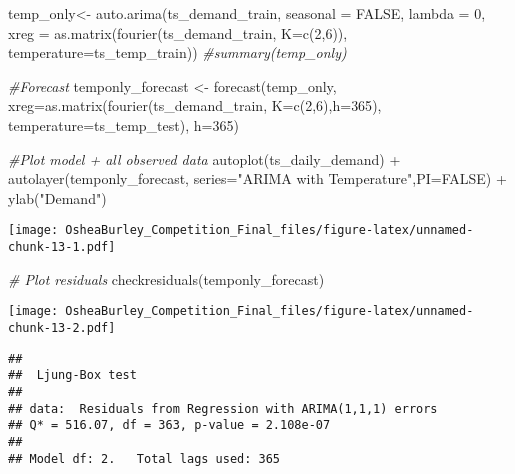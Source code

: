 \documentclass[
]{article}
\newenvironment{Shaded}{\begin{snugshade}}{\end{snugshade}}
\newcommand{\AttributeTok}[1]{\textcolor[rgb]{0.77,0.63,0.00}{#1}}
\newcommand{\CommentTok}[1]{\textcolor[rgb]{0.56,0.35,0.01}{\textit{#1}}}
\newcommand{\ConstantTok}[1]{\textcolor[rgb]{0.00,0.00,0.00}{#1}}
\newcommand{\DecValTok}[1]{\textcolor[rgb]{0.00,0.00,0.81}{#1}}
\newcommand{\FunctionTok}[1]{\textcolor[rgb]{0.00,0.00,0.00}{#1}}
\newcommand{\NormalTok}[1]{#1}
\newcommand{\OtherTok}[1]{\textcolor[rgb]{0.56,0.35,0.01}{#1}}
\newcommand{\SpecialCharTok}[1]{\textcolor[rgb]{0.00,0.00,0.00}{#1}}
\newcommand{\StringTok}[1]{\textcolor[rgb]{0.31,0.60,0.02}{#1}}
\begin{document}
\begin{Shaded}
\begin{Highlighting}[]
\NormalTok{temp\_only}\OtherTok{\textless{}{-}} \FunctionTok{auto.arima}\NormalTok{(ts\_demand\_train,}
                  \AttributeTok{seasonal =} \ConstantTok{FALSE}\NormalTok{, }
                  \AttributeTok{lambda =} \DecValTok{0}\NormalTok{,}
         \AttributeTok{xreg =} \FunctionTok{as.matrix}\NormalTok{(}\FunctionTok{fourier}\NormalTok{(ts\_demand\_train, }
                                          \AttributeTok{K=}\FunctionTok{c}\NormalTok{(}\DecValTok{2}\NormalTok{,}\DecValTok{6}\NormalTok{)),}
               \AttributeTok{temperature=}\NormalTok{ts\_temp\_train))}
\CommentTok{\#summary(temp\_only)}

\CommentTok{\#Forecast }
\NormalTok{temponly\_forecast }\OtherTok{\textless{}{-}} \FunctionTok{forecast}\NormalTok{(temp\_only,}
                           \AttributeTok{xreg=}\FunctionTok{as.matrix}\NormalTok{(}\FunctionTok{fourier}\NormalTok{(ts\_demand\_train, }
                                          \AttributeTok{K=}\FunctionTok{c}\NormalTok{(}\DecValTok{2}\NormalTok{,}\DecValTok{6}\NormalTok{),}\AttributeTok{h=}\DecValTok{365}\NormalTok{),}
                                \AttributeTok{temperature=}\NormalTok{ts\_temp\_test),}
                           \AttributeTok{h=}\DecValTok{365}\NormalTok{) }

\CommentTok{\#Plot model + all observed data}
\FunctionTok{autoplot}\NormalTok{(ts\_daily\_demand) }\SpecialCharTok{+}
  \FunctionTok{autolayer}\NormalTok{(temponly\_forecast, }\AttributeTok{series=}\StringTok{"ARIMA with Temperature"}\NormalTok{,}\AttributeTok{PI=}\ConstantTok{FALSE}\NormalTok{) }\SpecialCharTok{+}
  \FunctionTok{ylab}\NormalTok{(}\StringTok{"Demand"}\NormalTok{)}
\end{Highlighting}
\end{Shaded}

\texttt{[image: OsheaBurley\_Competition\_Final\_files/figure-latex/unnamed-chunk-13-1.pdf]}

\begin{Shaded}
\begin{Highlighting}[]
\CommentTok{\# Plot residuals}
\FunctionTok{checkresiduals}\NormalTok{(temponly\_forecast)}
\end{Highlighting}
\end{Shaded}

\texttt{[image: OsheaBurley\_Competition\_Final\_files/figure-latex/unnamed-chunk-13-2.pdf]}

\begin{verbatim}
## 
##  Ljung-Box test
## 
## data:  Residuals from Regression with ARIMA(1,1,1) errors
## Q* = 516.07, df = 363, p-value = 2.108e-07
## 
## Model df: 2.   Total lags used: 365
\end{verbatim}
\end{document}
